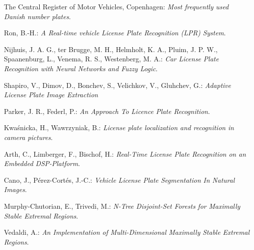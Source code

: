 \documentclass[11pt,a4paper,final]{article}
\begin{document}
\begin{thebibliography}{99}
%



 The Central Register of Motor Vehicles, Copenhagen: \textit{Most frequently used Danish number plates}.


 Ron, B.-H.: \textit{A Real-time vehicle License Plate Recognition (LPR) System}.

 Nijhuis, J. A. G., ter Brugge, M. H., Helmholt, K. A., Pluim, J. P. W., Spaanenburg, L., Venema, R. S., Westenberg, M. A.: \textit{Car License Plate Recognition with Neural Networks and Fuzzy Logic}.

 Shapiro, V., Dimov, D., Bonchev, S., Velichkov, V., Gluhchev, G.: \textit{Adaptive License Plate Image Extraction}

 Parker, J. R., Federl, P.: \textit{An Approach To Licence Plate Recognition}.

 Kwa\'snicka, H., Wawrzyniak, B.: \textit{License plate localization and recognition in camera pictures}.

 Arth, C., Limberger, F., Bischof, H.: \textit{Real-Time License Plate Recognition on an Embedded DSP-Platform}.

 Cano, J., Pérez-Cortés, J.-C.: \textit{Vehicle License Plate Segmentation In Natural Images}.





 Murphy-Chutorian, E., Trivedi, M.: \textit{N-Tree Disjoint-Set Forests for Maximally Stable Extremal Regions}.

 Vedaldi, A.: \textit{An Implementation of Multi-Dimensional Maximally Stable Extremal Regions}.


\end{thebibliography}
\end{document}
